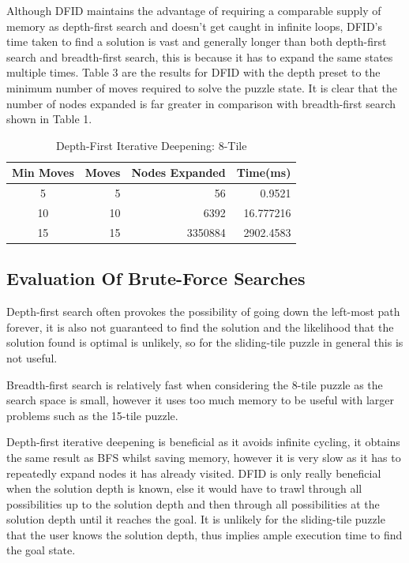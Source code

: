 \documentclass[progress]{cmpreport}
\begin{document}
Although DFID maintains the advantage of requiring a comparable supply of memory as depth-first search and doesn't get caught in infinite loops, DFID's time taken to find a solution is vast and generally longer than both depth-first search and breadth-first search, this is because it has to expand the same states multiple times. Table 3 are the results for DFID with the depth preset to the minimum number of moves required to solve the puzzle state. It is clear that the number of nodes expanded is far greater in comparison with breadth-first search shown in Table 1.

\begin{table}[ht]
	\caption{Depth-First Iterative Deepening: 8-Tile}
	\begin{center}
		\begin{tabular}{crrr} \hline
			Min Moves & Moves & Nodes Expanded &Time(ms)  \\ \hline
			5  & 5 & 56 & 0.9521 \\
			10 & 10  &6392&  16.777216 \\ 
			15 & 15 & 3350884& 2902.4583  \\ \hline
		
		\end{tabular}
	\end{center}
\end{table}



\subsection{Evaluation Of Brute-Force Searches}
Depth-first search often provokes the possibility of going down the left-most path forever, it is also not guaranteed to find the solution and the likelihood that the solution found is optimal is unlikely, so for the sliding-tile puzzle in general this is not useful. 

Breadth-first search is relatively fast when considering the 8-tile puzzle as the search space is small, however it uses too much memory to be useful with larger problems such as the 15-tile puzzle. 

Depth-first iterative deepening is beneficial as it avoids infinite cycling, it obtains the same result as BFS whilst saving memory, however it is very slow as it has to repeatedly expand nodes it has already visited. DFID is only really beneficial when the solution depth is known, else it would have to trawl through all possibilities up to the solution depth and then through all possibilities at the solution depth until it reaches the goal. It is unlikely for the sliding-tile puzzle that the user knows the solution depth, thus implies ample execution time to find the goal state.
\end{document}
